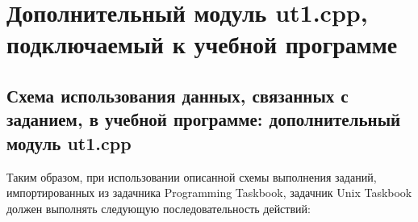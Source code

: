 



\section{Дополнительный модуль ut1.cpp, подключаемый к учебной программе}

\subsection{Схема использования данных, связанных с заданием, в учебной программе: дополнительный модуль ut1.cpp}
Таким образом, при использовании описанной схемы выполнения заданий, импортированных из задачника Programming Taskbook, задачник Unix Taskbook должен выполнять следующую последовательность действий:


